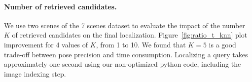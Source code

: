 
\paragraph{Number of retrieved candidates.} We use two scenes of the 7 scenes dataset to evaluate the impact of the number $K$ of retrieved candidates on the final localization. Figure~\ref{fig:ratio_t_knn} plot improvement for 4 values of $K$, from 1 to 10. We found that $K=5$ is a good trade-off between pose precision and time consumption. Localizing a query takes approximately one second using our non-optimized python code, including the image indexing step.